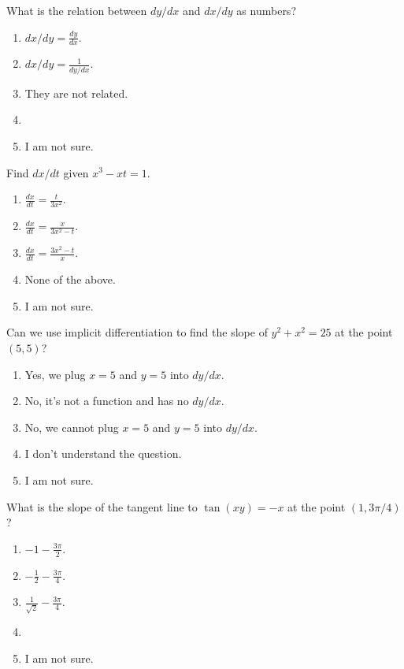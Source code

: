 \documentclass[aspectratio=169, 14pt, t]{beamer}  %
\begin{document}
\begin{poll}
  What is the relation between \(dy/dx\) and \(dx/dy\) as numbers?
  \begin{enumerate}
    \item \(dx/dy = \frac{dy}{dx}\).
    \item \(dx/dy = \frac{1}{dy/dx}\).
    \item They are not related.
    \item
    \item I am not sure.
  \end{enumerate}
\end{poll}

\begin{poll}
  Find \(dx/dt\) given \(x^{3} - xt = 1\).

  \begin{enumerate}
    \item \(\frac{dx}{dt} = \frac{t}{3x^{2}}\).
    \item \(\frac{dx}{dt} = \frac{x}{3x^{2} - t}\).
    \item \(\frac{dx}{dt} = \frac{3x^{2} - t}{x}\).
    \item None of the above.
    \item I am not sure.
  \end{enumerate}
\end{poll}

\begin{poll}
  Can we use implicit differentiation to find the slope of \(y^{2} + x^{2} = 25\) at the point \((5,5)\)?

  \begin{enumerate}
    \item Yes, we plug \(x = 5\) and \(y = 5\) into \(dy/dx\).
    \item No, it's not a function and has no \(dy/dx\).
    \item No, we cannot plug \(x = 5\) and \(y = 5\) into \(dy/dx\).
    \item I don't understand the question.
    \item I am not sure.
  \end{enumerate}
\end{poll}

\begin{poll}
  What is the slope of the tangent line to \(\tan(xy) = -x\) at the point \((1, 3\pi/4)\)?

  \begin{enumerate}
    \item \(-1 - \frac{3\pi}{2}\).
    \item \(-\frac{1}{2} - \frac{3\pi}{4}\).
    \item \(\frac{1}{\sqrt{2}} - \frac{3\pi}{4}\).
    \item
    \item I am not sure.
  \end{enumerate}
\end{poll}
\end{document}
